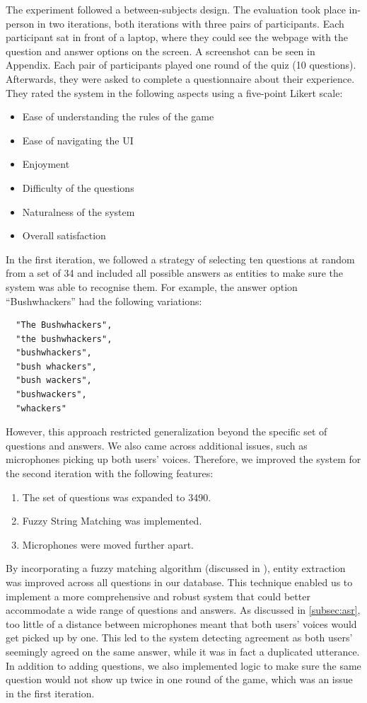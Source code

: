 \documentclass[hidelinks, 11pt]{article}
\begin{document}
The experiment followed a between-subjects design. The evaluation took place in-person in two iterations, both iterations with three pairs of participants. Each participant sat in front of a laptop, where they could see the webpage with the question and answer options on the screen. A screenshot can be seen in Appendix. Each pair of participants played one round of the quiz (10 questions). Afterwards, they were asked to complete a questionnaire about their experience. They rated the system in the following aspects using a five-point Likert scale:

\begin{itemize}
  \item Ease of understanding the rules of the game
  \item Ease of navigating the UI
  \item Enjoyment
  \item Difficulty of the questions
  \item Naturalness of the system
  \item Overall satisfaction
\end{itemize}

In the first iteration, we followed a strategy of selecting ten questions at random from a set of 34 and included all possible answers as entities to make sure the system was able to recognise them. For example, the answer option ``Bushwhackers'' had the following variations:

\begin{verbatim}
  "The Bushwhackers",
  "the bushwhackers",
  "bushwhackers",
  "bush whackers",
  "bush wackers",
  "bushwackers",
  "whackers"
\end{verbatim}

However, this approach restricted generalization beyond the specific set of questions and answers. We also came across additional issues, such as microphones picking up both users' voices. Therefore, we improved the system for the second iteration with the following features:

\begin{enumerate}
  \item The set of questions was expanded to 3490.
  \item Fuzzy String Matching was implemented.
  \item Microphones were moved further apart.
\end{enumerate}

By incorporating a fuzzy matching algorithm (discussed in ), entity extraction was improved across all questions in our database. This technique enabled us to implement a more comprehensive and robust system that could better accommodate a wide range of questions and answers. As discussed in \cref*{subsec:asr}, too little of a distance between microphones meant that both users' voices would get picked up by one. This led to the system detecting agreement as both users' seemingly agreed on the same answer, while it was in fact a duplicated utterance. In addition to adding questions, we also implemented logic to make sure the same question would not show up twice in one round of the game, which was an issue in the first iteration.
\end{document}
